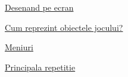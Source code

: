 
\begin{DoxyItemize}
\item \hyperlink{group__group__deseneaza__pe__ecran}{Desenand pe ecran}
\item \hyperlink{group__group__cum__reprezint__obiectele}{Cum reprezint obiectele jocului?}
\item \hyperlink{group__group__meniuri}{Meniuri}
\item \hyperlink{group__group__main__loop}{Principala repetitie} 
\end{DoxyItemize}